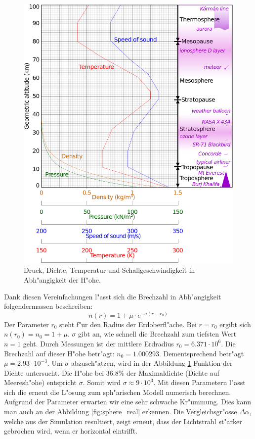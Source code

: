 \begin{refsection}
\begin{figure}
  \centering
  \includegraphics[scale=0.24]{licht/images/athmosphereProfile.png}
  
  \caption{Druck, Dichte, Temperatur und Schallgeschwindigkeit in Abh"angigkeit der H"ohe. \label{fig:athmosphere_profile}}
\end{figure}

Dank diesen Vereinfachungen l"asst sich die Brechzahl in Abh"angigkeit folgendermassen beschreiben:
$$n(r) = 1 + \mu \cdot e^{-\sigma (r - r_0)}$$
Der Parameter $r_0$ steht f"ur den Radius der Erdoberfl"ache. 
Bei $r = r_0$ ergibt sich $n(r_0) = n_0 = 1 + \mu$. 
$\sigma$ gibt an, wie schnell die Brechzahl zum tiefsten Wert $n = 1$ geht. 
Durch Messungen ist der mittlere Erdradius $r_0 = 6.371 \cdot 10^6$. 
Die Brechzahl auf dieser H"ohe betr"agt: $n_0 = 1.000293$.
Dementsprechend betr"agt $\mu = 2.93 \cdot 10^{-3}$. 
Um $\sigma$ abzusch"atzen, wird in der Abbildung \ref{fig:athmosphere_profile} Funktion der Dichte untersucht. 
Die H"ohe bei 36.8\% der Maximaldichte (Dichte auf Meeresh"ohe) entspricht $\sigma$. 
Somit wird $\sigma \approx 9 \cdot 10^3$.
Mit diesen Parametern l"asst sich die erneut die L"osung zum sph"arischen Modell numerisch berechnen. 
Aufgrund der Parameter erwarten wir eine sehr schwache Kr"ummung. 
Dies kann man auch an der Abbildung \ref{fig:sphere_real} erkennen. 
Die Vergleichsgr"osse $\Delta \alpha$, welche aus der Simulation resultiert, zeigt erneut, dass der Lichtstrahl st"arker gebrochen wird, wenn er horizontal eintrifft. 


\end{refsection}
